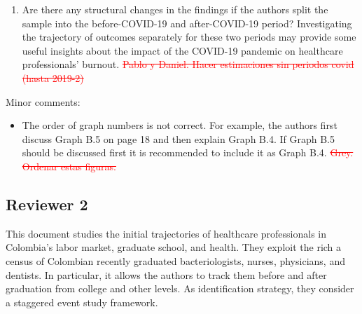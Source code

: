 \documentclass[12pt]{article}
\begin{document}
\begin{enumerate}
    \item Are there any structural changes in the findings if the authors split the sample into the before-COVID-19 and after-COVID-19 period? Investigating the trajectory of outcomes separately for these two periods may provide some useful insights about the impact of the COVID-19 pandemic on healthcare professionals' burnout. \textcolor{red}{\st{Pablo y Daniel. Hacer estimaciones sin periodos covid (hasta 2019-2)}}
\end{enumerate}

Minor comments:
\begin{itemize}
    \item The order of graph numbers is not correct. For example, the authors first discuss Graph B.5 on page 18 and then explain Graph B.4. If Graph B.5 should be discussed first it is recommended to include it as Graph B.4. \textcolor{red}{\st{Grey. Ordenar estas figuras.}}
\end{itemize}

\subsection{Reviewer 2}  

This document studies the initial trajectories of healthcare professionals in Colombia's
labor market, graduate school, and health. They exploit the rich a census of Colombian recently graduated bacteriologists, nurses, physicians, and dentists. In particular, it allows the authors to track them before and after graduation from college and other levels. As identification strategy, they consider a staggered event study framework.
\end{document}
